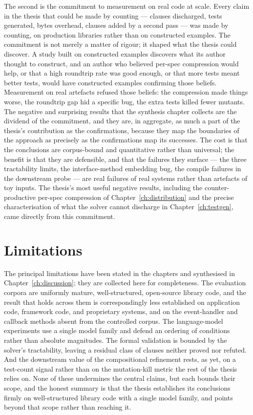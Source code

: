 The second is the commitment to measurement on real code at scale. Every claim
in the thesis that could be made by counting --- clauses discharged, tests
generated, bytes overhead, clauses added by a second pass --- was made by
counting, on production libraries rather than on constructed examples. The
commitment is not merely a matter of rigour; it shaped what the thesis could
discover. A study built on constructed examples discovers what its author thought
to construct, and an author who believed per-spec compression would help, or that a
high roundtrip rate was good enough, or that more tests meant better tests, would
have constructed examples confirming those beliefs. Measurement on real artefacts
refused those beliefs: the compression made things worse, the roundtrip gap hid a
specific bug, the extra tests killed fewer mutants. The negative and surprising
results that the synthesis chapter collects are the dividend of the commitment, and
they are, in aggregate, as much a part of the thesis's contribution as the
confirmations, because they map the boundaries of the approach as precisely as the
confirmations map its successes. The cost
is that the conclusions are corpus-bound and quantitative rather than universal;
the benefit is that they are defensible, and that the failures they surface ---
the three tractability limits, the interface-method embedding bug, the
compile failures in the downstream probe --- are real failures of real systems
rather than artefacts of toy inputs. The thesis's most useful negative results,
including the counter-productive per-spec compression of
Chapter~\ref{ch:distribution} and the precise characterisation of what the
solver cannot discharge in Chapter~\ref{ch:testgen}, came directly from this
commitment.

\section{Limitations}

The principal limitations have been stated in the chapters and synthesised in
Chapter~\ref{ch:discussion}; they are collected here for completeness. The
evaluation corpora are uniformly mature, well-structured, open-source library
code, and the result that holds across them is correspondingly less established
on application code, framework code, and proprietary systems, and on the
event-handler and callback methods absent from the controlled corpus. The
language-model experiments use a single model family and defend an ordering of
conditions rather than absolute magnitudes. The formal validation is bounded by
the solver's tractability, leaving a residual class of clauses neither proved nor
refuted. And the downstream value of the compositional refinement rests, as yet,
on a test-count signal rather than on the mutation-kill metric the rest of the
thesis relies on. None of these undermines the central claims, but each bounds
their scope, and the honest summary is that the thesis establishes its
conclusions firmly on well-structured library code with a single model family,
and points beyond that scope rather than reaching it.

